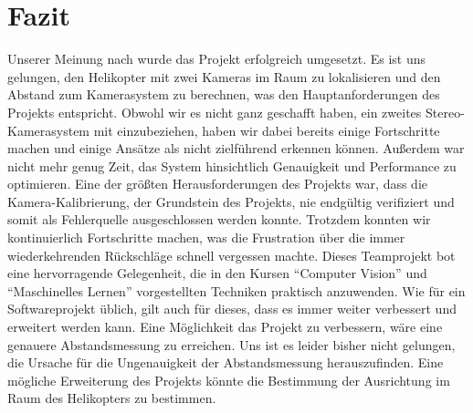 \chapter{Fazit}
\label{cha:faiz}

Unserer Meinung nach wurde das Projekt erfolgreich umgesetzt. Es ist uns gelungen, den Helikopter mit zwei Kameras im Raum zu lokalisieren und den Abstand zum Kamerasystem zu berechnen, was den Hauptanforderungen des Projekts entspricht. Obwohl wir es nicht ganz geschafft haben, ein zweites Stereo-Kamerasystem mit einzubeziehen, haben wir dabei bereits einige Fortschritte machen und einige Ansätze als nicht zielführend erkennen können. Außerdem war nicht mehr genug Zeit, das System hinsichtlich Genauigkeit und Performance zu optimieren. Eine der größten Herausforderungen des Projekts war, dass die Kamera-Kalibrierung, der Grundstein des Projekts, nie endgültig verifiziert und somit als Fehlerquelle ausgeschlossen werden konnte. Trotzdem konnten wir kontinuierlich Fortschritte machen, was die Frustration über die immer wiederkehrenden Rückschläge schnell vergessen machte. Dieses Teamprojekt bot eine hervorragende Gelegenheit, die in den Kursen “Computer Vision” und “Maschinelles Lernen” vorgestellten Techniken praktisch anzuwenden. 
Wie für ein Softwareprojekt üblich, gilt auch für dieses, dass es immer weiter verbessert und erweitert werden kann. Eine Möglichkeit das Projekt zu verbessern, wäre eine genauere Abstandsmessung zu erreichen. Uns ist es leider bisher nicht gelungen, die Ursache für die Ungenauigkeit der Abstandsmessung herauszufinden. Eine mögliche Erweiterung des Projekts könnte die Bestimmung der Ausrichtung im Raum des Helikopters zu bestimmen.